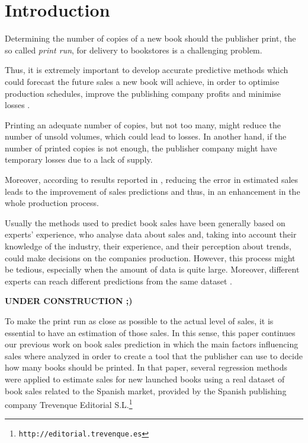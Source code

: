 \documentclass[a4paper,10pt,twocolumn,preprint,3p]{elsarticle}
\begin{document}
\section{Introduction}
\label{sec:intro}

Determining the number of copies of a new book should the publisher print, the 
so called {\em print run}, for delivery to bookstores is a challenging problem.

Thus, it is extremely important to develop accurate predictive methods which 
could forecast the future sales a new book will achieve, in order to optimise 
production schedules, improve the publishing company profits and minimise 
losses \cite{Zhao2001}.

Printing an adequate number of copies, but not too many, might reduce the number 
of unsold volumes, which could lead to losses. 
In another hand, if the number of printed copies is not enough, the publisher 
company might have temporary losses due to a lack of supply.

Moreover, according to results reported in \cite{Fildes2010,Saeed2008}, reducing 
the error in estimated sales leads to the improvement of sales predictions and 
thus, in an enhancement in the whole production process.

Usually the methods used to predict book sales have
been generally based on experts' experience, who analyse data about sales and, 
taking into account their knowledge of the industry, their experience, and their 
perception about trends, could make decisions on the companies production.
However, this process might be tedious, especially when the amount of data is 
quite large. Moreover, different experts can reach different predictions from 
the same dataset \cite{Sanders1994}.


\textbf{UNDER CONSTRUCTION ;) }


To make the print run as close as possible to the actual level of sales, it is 
essential to have an estimation of those sales. 
In this sense, this paper continues our previous work on book sales prediction 
\cite{Castillo2016books} in which the main factors influencing sales where 
analyzed in order to create a tool that the publisher can use to decide how many 
books should be printed.
In that paper, several regression methods were applied to estimate sales for new launched books using a real dataset of book sales related to the Spanish market, provided by the Spanish publishing company Trevenque Editorial S.L.\footnote{\tt http://editorial.trevenque.es}
\end{document}
